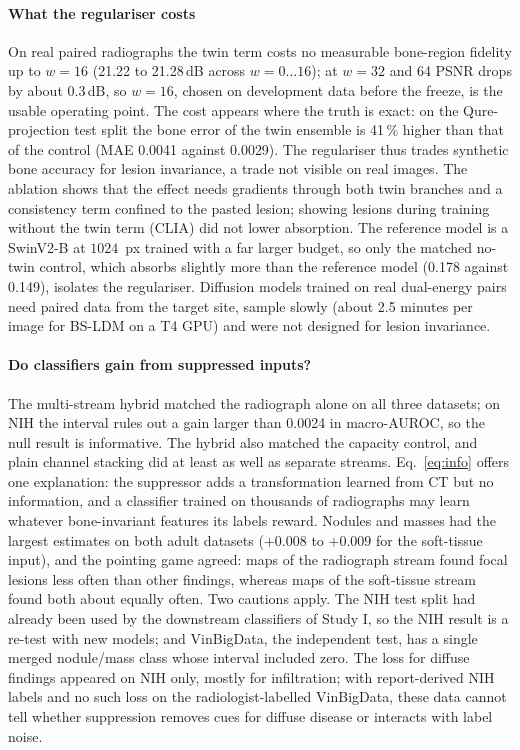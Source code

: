 \paragraph{What the regulariser costs} On real paired radiographs the twin term costs no measurable bone-region fidelity up to $w=16$ (21.22
to 21.28\,dB across $w=0\ldots16$); at $w=32$ and 64 PSNR drops by about 0.3\,dB, so $w=16$, chosen on development data before the freeze,
is the usable operating point. The cost appears where the truth is exact: on the Qure-projection test split the bone error of the twin
ensemble is 41\,\% higher than that of the control (MAE 0.0041 against 0.0029). The regulariser thus trades synthetic bone accuracy for
lesion invariance, a trade not visible on real images. The ablation shows that the effect needs gradients through both twin branches and a
consistency term confined to the pasted lesion; showing lesions during training without the twin term (CLIA) did not lower absorption. The
reference model is a SwinV2-B at $1024$~px trained with a far larger budget, so only the matched no-twin control, which absorbs slightly more
than the reference model (0.178 against 0.149), isolates the regulariser. Diffusion models trained on real dual-energy pairs
\citep{sun2026bsldm,sun2026debonedit} need paired data from the target site, sample slowly (about 2.5 minutes per image for BS-LDM on a T4
GPU) and were not designed for lesion invariance.

\paragraph{Do classifiers gain from suppressed inputs?} The multi-stream hybrid matched the radiograph alone on all three datasets; on NIH the
interval rules out a gain larger than 0.0024 in macro-AUROC, so the null result is informative. The hybrid also matched the capacity
control, and plain channel stacking did at least as well as separate streams. Eq.~\eqref{eq:info} offers one explanation: the suppressor adds
a transformation learned from CT but no information, and a classifier trained on thousands of radiographs may learn whatever bone-invariant
features its labels reward. Nodules and masses had the largest estimates on both adult datasets ($+0.008$ to $+0.009$ for the soft-tissue
input), and the pointing game agreed: maps of the radiograph stream found focal lesions less often than other findings, whereas maps of the
soft-tissue stream found both about equally often. Two cautions apply. The NIH test split had already been used by the downstream classifiers
of Study I, so the NIH result is a re-test with new models; and VinBigData, the independent test, has a single merged nodule/mass class
whose interval included zero. The loss for diffuse findings appeared on NIH only, mostly for infiltration; with report-derived NIH labels
\citep{wang2017chestxray} and no such loss on the radiologist-labelled VinBigData, these data cannot tell whether suppression removes cues
for diffuse disease or interacts with label noise.

